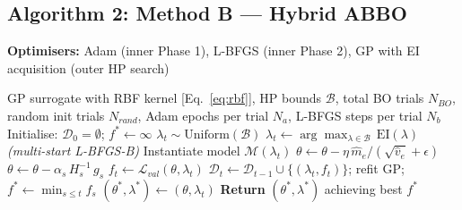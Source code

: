 \documentclass[11pt]{article}
\theoremstyle{definition}
\begin{document}
\subsection{Algorithm 2: Method B --- Hybrid ABBO}
\begin{algorithm}[H]
\caption{Method B --- Hybrid ABBO}
\label{alg:abbo}
\textbf{Optimisers:} Adam (inner Phase 1), L-BFGS (inner Phase 2),
GP with EI acquisition (outer HP search)
\begin{algorithmic}[1]
\Require GP surrogate with RBF kernel [Eq.~\eqref{eq:rbf}],
         HP bounds $\mathcal{B}$,
         total BO trials $N_{BO}$,
         random init trials $N_{rand}$,
         Adam epochs per trial $N_a$,
         L-BFGS steps per trial $N_b$
\State Initialise: $\mathcal{D}_0 = \emptyset$; $f^* \leftarrow \infty$
    \State $\lambda_t \sim \mathrm{Uniform}(\mathcal{B})$
  \Else
    \State $\lambda_t \leftarrow \arg\max_{\lambda \in \mathcal{B}}\,\mathrm{EI}(\lambda)$
           \hfill \textit{(multi-start L-BFGS-B)}
  \EndIf
  \State Instantiate model $\mathcal{M}(\lambda_t)$
    \State $\theta \leftarrow \theta - \eta\,\hat{m}_e / (\sqrt{\hat{v}_e}+\epsilon)$
  \EndFor
    \State $\theta \leftarrow \theta - \alpha_s\,H_s^{-1}\,g_s$
  \EndFor
  \State $f_t \leftarrow \mathcal{L}_{val}(\theta, \lambda_t)$
  \State $\mathcal{D}_t \leftarrow \mathcal{D}_{t-1} \cup \{(\lambda_t, f_t)\}$;
         refit GP; $f^* \leftarrow \min_{s \le t} f_s$
    \State $(\theta^*, \lambda^*) \leftarrow (\theta, \lambda_t)$
  \EndIf
\EndFor
\State \textbf{Return} $(\theta^*, \lambda^*)$ achieving best $f^*$
\end{algorithmic}
\end{algorithm}
\end{document}
